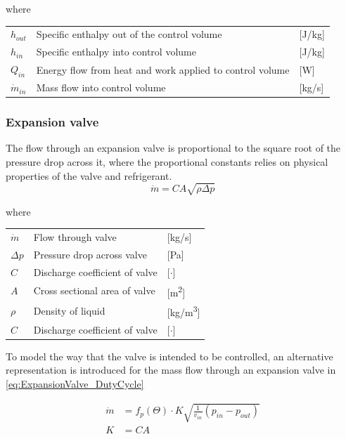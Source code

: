 where
\begin{center}
	\begin{tabular}{l p{8cm} l}
		$h_{out}$ 		& Specific enthalpy out of the control volume & [\si{J}/\si{kg}]\\
		$h_{in}$ 		& Specific enthalpy into control volume & [\si{J}/\si{kg}]\\
		$Q_{in}$ 		& Energy flow from heat and work applied to control volume & [\si{W}]\\
		$\dot{m}_{in}$ 	& Mass flow into control volume & [\si{kg}/\si{s}]\\
	\end{tabular}
\end{center}

\subsubsection{Expansion valve}
The flow through an expansion valve is proportional to the square root of the pressure drop across it, where the proportional constants relies on physical properties of the valve and refrigerant.
\begin{equation} \label{eq:ExpansionValve}
	\dot{m}= C A \sqrt{\rho\Delta p}
\end{equation}

where
\begin{center}
	\begin{tabular}{l p{8cm} l}
		$\dot{m}$ 	& Flow through valve & [\si{kg}/\si{s}]\\
		$\Delta p$ 	& Pressure drop across valve & [\si{Pa}]\\
		$C$ 		& Discharge coefficient of valve & [$\cdot$]\\
		$A$	 		& Cross sectional area of valve & [\si{m^2}]\\
		$\rho$ 		& Density of liquid & [\si{kg}/\si{m^3}]\\
			$C$ 	& Discharge coefficient of valve & [$\cdot$]\\
	\end{tabular}
\end{center}

To model the way that the valve is intended to be controlled, an alternative representation is introduced for the mass flow through an expansion valve in \cref{eq:ExpansionValve_DutyCycle}


\begin{equation} \label{eq:ExpansionValve_DutyCycle}
	\begin{split}
		\dot{m} &= f_p(\Theta) \cdot K  \sqrt{\frac{1}{v_{in}} (p_{in} - p_{out})}\\
		K 			&= C A
	\end{split}
\end{equation}


